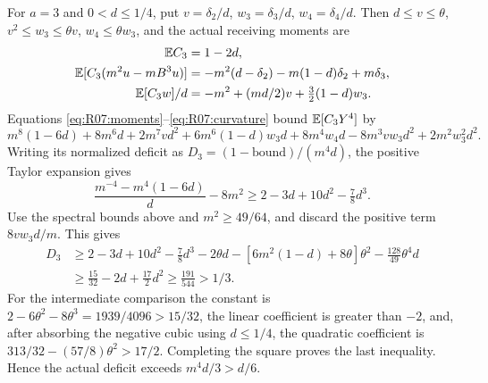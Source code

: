 For $a=3$ and $0<d\le1/4$, put $v=\delta_2/d$,
$w_3=\delta_3/d$, $w_4=\delta_4/d$. Then
$d\le v\le\theta$, $v^2\le w_3\le\theta v$, $w_4\le\theta w_3$,
and the actual receiving moments are
\begin{align*}
 \mathbb E C_3&=1-2d,\\
 \mathbb E[C_3(m^2u-mB^3u)]&=-m^2(d-\delta_2)-m(1-d)\delta_2+m\delta_3,\\
 \mathbb E[C_3w]/d&=-m^2+(md/2)v+\tfrac32(1-d)w_3.
\end{align*}
Equations \eqref{eq:R07:moments}--\eqref{eq:R07:curvature} bound
$\mathbb E[C_3Y^4]$ by
\[
 m^8(1-6d)+8m^6d+2m^7vd^2+6m^6(1-d)w_3d
 +8m^4w_4d-8m^3vw_3d^2+2m^2w_3^2d^2.
\]
Writing its normalized deficit as $D_3=(1-\text{bound})/(m^4d)$,
the positive Taylor expansion gives
\[
 \frac{m^{-4}-m^4(1-6d)}d-8m^2
 \ge2-3d+10d^2-\tfrac78d^3.
\]
Use the spectral bounds above and $m^2\ge49/64$, and discard the
positive term $8vw_3d/m$. This gives
\begin{align*}
 D_3&\ge2-3d+10d^2-\tfrac78d^3-2\theta d
 -[6m^2(1-d)+8\theta]\theta^2-\tfrac{128}{49}\theta^4d\\
 &\ge\tfrac{15}{32}-2d+\tfrac{17}{2}d^2
 \ge\tfrac{191}{544}>1/3.
\end{align*}
For the intermediate comparison the constant is
$2-6\theta^2-8\theta^3=1939/4096>15/32$,
the linear coefficient is greater than $-2$, and, after absorbing the
negative cubic using $d\le1/4$, the quadratic coefficient is
$313/32-(57/8)\theta^2>17/2$. Completing the square proves the last
inequality. Hence the actual deficit exceeds $m^4d/3>d/6$.

